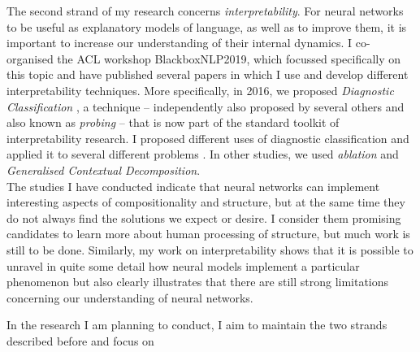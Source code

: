 \documentclass[11pt,a4paper,roman, linkcolor=false]{moderncv}        %
\begin{document}
The second strand of my research concerns \emph{interpretability}.
For neural networks to be useful as explanatory models of language, as well as to improve them, it is important to increase our understanding of their internal dynamics.%
I co-organised the ACL workshop BlackboxNLP2019, which focussed specifically on this topic and have published several papers in which I use and develop different interpretability techniques.
More specifically, in 2016, we proposed \emph{Diagnostic Classification} \citep*{veldhoen2016diagnostic,hupkes2018diagnostic}, a technique -- independently also proposed by several others and also known as \emph{probing} -- that is now part of the standard toolkit of interpretability research.
I proposed different uses of diagnostic classification and applied it to several different problems \citep[i.a.][]{baan2019realization,hupkes2018analysing,lakretz2019emergence,ulmer2019assessing}. 
In other studies, we used \emph{ablation} \citep{lakretz2019emergence} and \emph{Generalised Contextual Decomposition}.\\

The studies I have conducted indicate that neural networks can implement interesting aspects of compositionality and structure, but at the same time they do not always find the solutions we expect or desire.
I consider them promising candidates to learn more about human processing of structure, but much work is still to be done.
Similarly, my work on interpretability shows that it is possible to unravel in quite some detail how neural models implement a particular phenomenon but also clearly illustrates that there are still strong limitations concerning our understanding of neural networks.

In the research I am planning to conduct, I aim to maintain the two strands described before and focus on 




\end{document}
